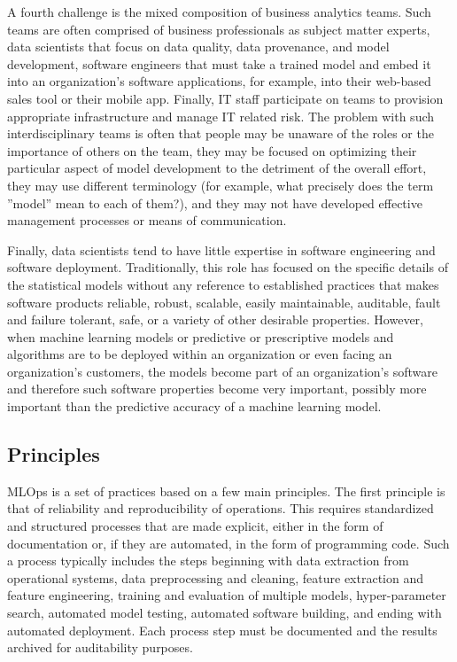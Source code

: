 A fourth challenge is the mixed composition of business analytics teams. Such teams are often comprised of business professionals as subject matter experts, data scientists that focus on data quality, data provenance, and model development, software engineers that must take a trained model and embed it into an organization's software applications, for example, into their web-based sales tool or their mobile app. Finally, IT staff participate on teams to provision appropriate infrastructure and manage IT related risk. The problem with such interdisciplinary teams is often that people may be unaware of the roles or the importance of others on the team, they may be focused on optimizing their particular aspect of model development to the detriment of the overall effort, they may use different terminology (for example, what precisely does the term ''model'' mean to each of them?), and they may not have developed effective management processes or means of communication. 

Finally, data scientists tend to have little expertise in software engineering and software deployment. Traditionally, this role has focused on the specific details of the statistical models without any reference to established practices that makes software products reliable, robust, scalable, easily maintainable, auditable, fault and failure tolerant, safe, or a variety of other desirable properties. However, when machine learning models or predictive or prescriptive models and algorithms are to be deployed within an organization or even facing an organization's customers, the models become part of an organization's software and therefore such software properties become very important, possibly more important than the predictive accuracy of a machine learning model. 

\subsection*{Principles}

MLOps is a set of practices based on a few main principles. The first principle is that of reliability and reproducibility of operations. This requires standardized and structured processes that are made explicit, either in the form of documentation or, if they are automated, in the form of programming code. Such a process typically includes the steps beginning with data extraction from operational systems, data preprocessing and cleaning, feature extraction and feature engineering, training and evaluation of multiple models, hyper-parameter search, automated model testing, automated software building, and ending with automated deployment. Each process step must be documented and the results archived for auditability purposes. 

